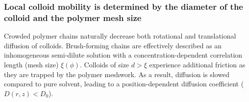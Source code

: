 \documentclass[12pt, a4paper]{article}
\begin{document}
\subsubsection{Local colloid mobility is determined by the diameter of the colloid and the polymer mesh size}

Crowded polymer chains naturally decrease both rotational \cite{Fu2017} and translational \cite{Stewart1998} diffusion of colloids.
Brush-forming chains are effectively described as an inhomogeneous semi-dilute solution with a concentration-dependent correlation length (mesh size) $\xi(\phi)$.
Colloids of size $d > \xi$ experience additional friction as they are trapped by the polymer meshwork.
As a result, diffusion is slowed compared to pure solvent, leading to a position-dependent diffusion coefficient ($D(r,z) < D_0$).





\end{document}
